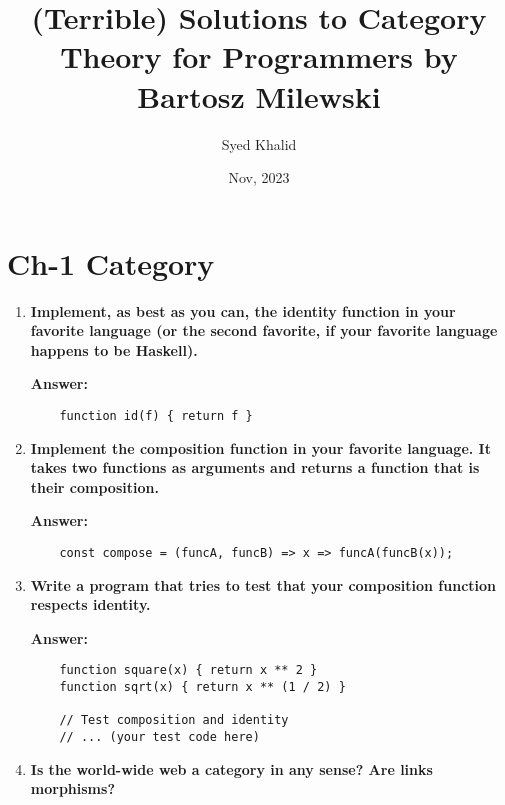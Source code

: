 \documentclass{article}
\begin{document}
\title{(Terrible) Solutions to Category Theory for Programmers by Bartosz Milewski}
\author{Syed Khalid}
\date{Nov, 2023}
\maketitle

\section{Ch-1 Category}
\begin{enumerate}
	\item \textbf{Implement, as best as you can, the identity function in your favorite language (or the second favorite, if your favorite language happens to be Haskell).}

	      \textbf{Answer:}
	      \begin{verbatim}
    function id(f) { return f }
    \end{verbatim}

	\item \textbf{Implement the composition function in your favorite language. It takes two functions as arguments and returns a function that is their composition.}

	      \textbf{Answer:}
	      \begin{verbatim}
    const compose = (funcA, funcB) => x => funcA(funcB(x));
    \end{verbatim}

	\item \textbf{Write a program that tries to test that your composition function respects identity.}

	      \textbf{Answer:}
	      \begin{verbatim}
    function square(x) { return x ** 2 }
    function sqrt(x) { return x ** (1 / 2) }

    // Test composition and identity
    // ... (your test code here)
    \end{verbatim}

	\item \textbf{Is the world-wide web a category in any sense? Are links morphisms?}


\end{enumerate}
\end{document}
